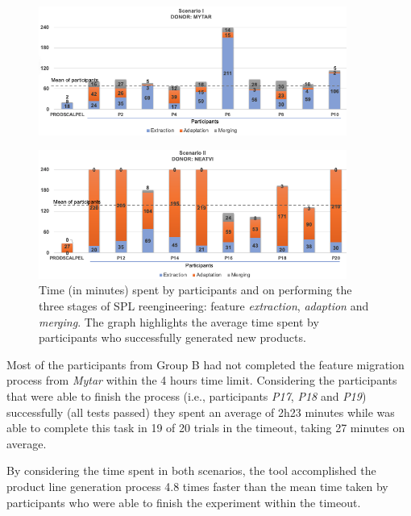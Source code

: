 \begin{figure}[t]
	\centering \includegraphics[width=0.9\textwidth]{images/experiment_result-SC1-4.png}
	\label{fig:experiment_result_time_I}
\end{figure} 
\begin{figure}[t]
	\centering \includegraphics[width=0.9\textwidth]{images/experiment_result-SC2-4.png}
	\centering \caption{Time (in minutes) spent by participants and \prodscalpel on performing the three stages of SPL reengineering: feature \emph{extraction}, \emph{adaption} and \emph{merging}. The graph highlights the average time spent by participants who successfully generated new products.} 
	\label{fig:experiment_result_time_II}
\end{figure} 

Most of the participants from Group B had not completed the feature migration process from \emph{Mytar}  within the 4 hours time limit. Considering the participants that were able to finish the process (i.e., participants \emph{P17}, \emph{P18} and \emph{P19}) successfully (all tests passed) they spent an average of 2h23 minutes while \prodscalpel was able to complete this task in 19 of 20 trials in the timeout, taking 27 minutes on average.

By considering the time spent in both scenarios, the tool accomplished the product line generation process 4.8 times faster than the mean time taken by participants who were able to finish the experiment within the timeout.


